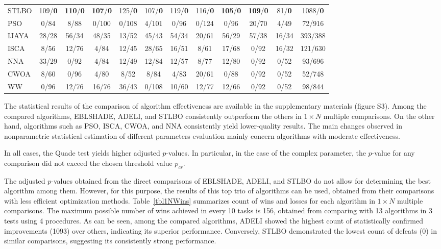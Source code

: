 \documentclass[a4paper,fleqn]{cas-sc}
\begin{document}
\begin{table}[<options>]
\begin{tabular*}{\tblwidth}{@{}LCCCCCCCCCCC@{}}
STLBO & 109/\textbf{0} & \textbf{110}/\textbf{0}  & \textbf{107}/\textbf{0}  & 125/\textbf{0}  & 107/\textbf{0}  & 119/\textbf{0}  & 116/\textbf{0}  & \textbf{105}/\textbf{0}  & \textbf{109}/\textbf{0} & 81/\textbf{0}  & 1088/\textbf{0}\\
PSO & 0/84  & 8/88  & 0/100  & 0/108  & 4/101  & 0/96  &  0/124 & 0/96  & 20/70  & 4/49  & 72/916\\
IJAYA &  28/28 &  56/34 &  48/35 & 13/52  & 45/43 &  54/34 &  20/61 & 56/29  & 57/38  & 16/34  & 393/388\\
ISCA & 8/56  & 12/76  & 4/84  & 12/45  & 28/65  & 16/51  & 8/61  & 17/68  & 0/92  & 16/32  & 121/630\\
NNA & 33/29  & 0/92  & 4/84  & 12/49  & 12/84  & 12/57  & 8/77  & 12/80  & 0/92& 0/52  & 93/696\\
CWOA & 8/60  & 0/96  &  4/80& 8/52  & 8/84& 4/83  & 20/61  & 0/88  & 0/92 & 0/52  & 52/748\\
WW & 0/96  & 12/76  & 16/76&  36/43 & 0/108 & 10/60 & 12/77  & 12/66  & 0/92& 0/52  & 98/844\\
\bottomrule
\end{tabular*}
\end{table}


The statistical results of the comparison of algorithm effectiveness are available in the supplementary materials (figure S3).
Among the compared algorithms, EBLSHADE, ADELI, and STLBO consistently outperform the others in $1\times N$ multiple comparisons.
On the other hand, algorithms such as PSO, ISCA, CWOA, and NNA consistently yield lower-quality results.
The main changes observed in nonparametric statistical estimation of different parameters evaluation 
mainly concern algorithms with moderate effectiveness.



In all cases, the Quade test yields higher adjusted $p$-values.
In particular, in the case of the complex parameter, the $p$-value for any comparison did not exceed the chosen threshold value $p_{cr}$.




The adjusted $p$-values obtained from the direct comparisons of EBLSHADE, ADELI, and STLBO
do not allow for determining the best algorithm among them.
However, for this purpose, the results of this top trio of algorithms can be used,
obtained from their comparisons with less efficient optimization methods.
Table~\ref{tbl1NWins} summarizes count of wins and losses for each algorithm in $1\times N$ multiple comparisons.
The maximum possible number of wins achieved in every 10 tasks is 156,
obtained from comparing with 13 algorithms in 3 tests using 4 procedures.
As can be seen, among the compared algorithms,
ADELI showed the highest count of statistically confirmed improvements (1093) over others,
indicating its superior performance.
Conversely, STLBO demonstrated the lowest count of defeats (0) in similar comparisons, suggesting its consistently strong performance.
\end{document}
